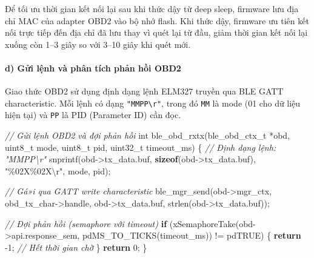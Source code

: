 \documentclass[a4paper]{extarticle}
\newenvironment{Shaded}{}{}
\newcommand{\CommentTok}[1]{\textcolor[rgb]{0.38,0.63,0.69}{\textit{#1}}}
\newcommand{\ControlFlowTok}[1]{\textcolor[rgb]{0.00,0.44,0.13}{\textbf{#1}}}
\newcommand{\DataTypeTok}[1]{\textcolor[rgb]{0.56,0.13,0.00}{#1}}
\newcommand{\DecValTok}[1]{\textcolor[rgb]{0.25,0.63,0.44}{#1}}
\newcommand{\KeywordTok}[1]{\textcolor[rgb]{0.00,0.44,0.13}{\textbf{#1}}}
\newcommand{\NormalTok}[1]{#1}
\newcommand{\OperatorTok}[1]{\textcolor[rgb]{0.40,0.40,0.40}{#1}}
\newcommand{\SpecialCharTok}[1]{\textcolor[rgb]{0.25,0.44,0.63}{#1}}
\newcommand{\StringTok}[1]{\textcolor[rgb]{0.25,0.44,0.63}{#1}}
\begin{document}
Để tối ưu thời gian kết nối lại sau khi thức dậy từ deep sleep, firmware
lưu địa chỉ MAC của adapter OBD2 vào bộ nhớ flash. Khi thức dậy,
firmware ưu tiên kết nối trực tiếp đến địa chỉ đã lưu thay vì quét lại
từ đầu, giảm thời gian kết nối lại xuống còn 1--3 giây so với 3--10 giây
khi quét mới.

\paragraph{d) Gửi lệnh và phân tích phản hồi
OBD2}\label{d-gux1eedi-lux1ec7nh-vuxe0-phuxe2n-tuxedch-phux1ea3n-hux1ed3i-obd2}

Giao thức OBD2 sử dụng định dạng lệnh ELM327 truyền qua BLE GATT
characteristic. Mỗi lệnh có dạng \texttt{"MMPP\textbackslash{}r"}, trong
đó \texttt{MM} là mode (01 cho dữ liệu hiện tại) và \texttt{PP} là PID
(Parameter ID) cần đọc.

\begin{Shaded}
\begin{Highlighting}[]
\CommentTok{// Gửi lệnh OBD2 và đợi phản hồi}
\DataTypeTok{int}\NormalTok{ ble\_obd\_rxtx}\OperatorTok{(}\NormalTok{ble\_obd\_ctx\_t }\OperatorTok{*}\NormalTok{obd}\OperatorTok{,} \DataTypeTok{uint8\_t}\NormalTok{ mode}\OperatorTok{,} \DataTypeTok{uint8\_t}\NormalTok{ pid}\OperatorTok{,}
                 \DataTypeTok{uint32\_t}\NormalTok{ timeout\_ms}\OperatorTok{)}
\OperatorTok{\{}
    \CommentTok{// Định dạng lệnh: "MMPP\textbackslash{}r"}
\NormalTok{    snprintf}\OperatorTok{(}\NormalTok{obd}\OperatorTok{{-}\textgreater{}}\NormalTok{tx\_data}\OperatorTok{.}\NormalTok{buf}\OperatorTok{,} \KeywordTok{sizeof}\OperatorTok{(}\NormalTok{obd}\OperatorTok{{-}\textgreater{}}\NormalTok{tx\_data}\OperatorTok{.}\NormalTok{buf}\OperatorTok{),}
             \StringTok{"}\SpecialCharTok{\%02X\%02X\textbackslash{}r}\StringTok{"}\OperatorTok{,}\NormalTok{ mode}\OperatorTok{,}\NormalTok{ pid}\OperatorTok{);}

    \CommentTok{// Gá»­i qua GATT write characteristic}
\NormalTok{    ble\_mgr\_send}\OperatorTok{(}\NormalTok{obd}\OperatorTok{{-}\textgreater{}}\NormalTok{mgr\_ctx}\OperatorTok{,}\NormalTok{ obd\_tx\_char}\OperatorTok{{-}\textgreater{}}\NormalTok{handle}\OperatorTok{,}
\NormalTok{                 obd}\OperatorTok{{-}\textgreater{}}\NormalTok{tx\_data}\OperatorTok{.}\NormalTok{buf}\OperatorTok{,}\NormalTok{ strlen}\OperatorTok{(}\NormalTok{obd}\OperatorTok{{-}\textgreater{}}\NormalTok{tx\_data}\OperatorTok{.}\NormalTok{buf}\OperatorTok{));}

    \CommentTok{// Đợi phản hồi (semaphore với timeout)}
    \ControlFlowTok{if} \OperatorTok{(}\NormalTok{xSemaphoreTake}\OperatorTok{(}\NormalTok{obd}\OperatorTok{{-}\textgreater{}}\NormalTok{api}\OperatorTok{.}\NormalTok{response\_sem}\OperatorTok{,}
\NormalTok{                       pdMS\_TO\_TICKS}\OperatorTok{(}\NormalTok{timeout\_ms}\OperatorTok{))} \OperatorTok{!=}\NormalTok{ pdTRUE}\OperatorTok{)} \OperatorTok{\{}
        \ControlFlowTok{return} \OperatorTok{{-}}\DecValTok{1}\OperatorTok{;}  \CommentTok{// Hết thời gian chờ}
    \OperatorTok{\}}
    \ControlFlowTok{return} \DecValTok{0}\OperatorTok{;}
\OperatorTok{\}}
\end{Highlighting}
\end{Shaded}
\end{document}
